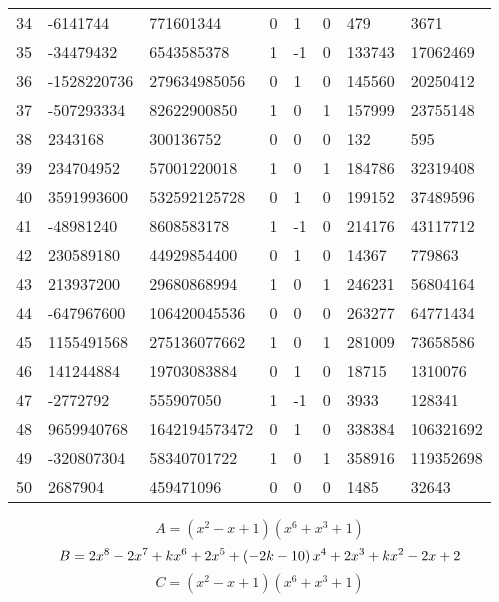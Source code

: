 \documentclass{amsart}
\begin{document}
\begin{longtable}{|l|l|l|lllll|}
34&-6141744&771601344&0&1&0&479&3671\\
35&-34479432&6543585378&1&-1&0&133743&17062469\\
36&-1528220736&279634985056&0&1&0&145560&20250412\\
37&-507293334&82622900850&1&0&1&157999&23755148\\
38&2343168&300136752&0&0&0&132&595\\
39&234704952&57001220018&1&0&1&184786&32319408\\
40&3591993600&532592125728&0&1&0&199152&37489596\\
41&-48981240&8608583178&1&-1&0&214176&43117712\\
42&230589180&44929854400&0&1&0&14367&779863\\
43&213937200&29680868994&1&0&1&246231&56804164\\
44&-647967600&106420045536&0&0&0&263277&64771434\\
45&1155491568&275136077662&1&0&1&281009&73658586\\
46&141244884&19703083884&0&1&0&18715&1310076\\
47&-2772792&555907050&1&-1&0&3933&128341\\
48&9659940768&1642194573472&0&1&0&338384&106321692\\
49&-320807304&58340701722&1&0&1&358916&119352698\\
50&2687904&459471096&0&0&0&1485&32643\\
\hline
\end{longtable}
$$A=(x^2
 - x
 + 1)(x^6
 + x^3
 + 1)$$
$$B=2\*x^8
 - 2\*x^7
 + k\*x^6
 + 2\*x^5
 + \left(-2\*k
 - 10\right) \*x^4
 + 2\*x^3
 + k\*x^2
 - 2\*x
 + 2$$
$$C=(x^2
 - x
 + 1)(x^6
 + x^3
 + 1)$$
\end{document}
